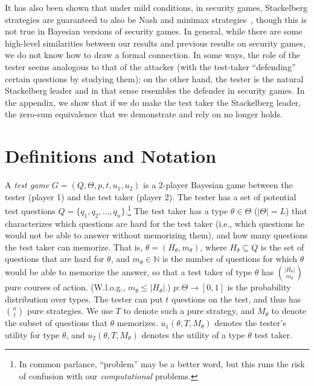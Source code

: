 \documentclass{article}
\begin{document}
It has also been shown that under mild conditions, in security games,
Stackelberg strategies are guaranteed to also be Nash and minimax
strategies~\cite{Korzhyk11:Stackelberg}, though this is not true in
Bayesian versions of
security games.
In general, while there are some high-level similarities between our results and
previous results on security games, we do not know how to draw a formal
connection.  In some ways, the role of the tester seems analogous to
that of the attacker
(with the test-taker ``defending'' certain questions by studying
them); on the other
hand, the tester is the natural Stackelberg leader and in that sense
resembles the defender in security games.
In the appendix, we show that if we do make the test taker the
Stackelberg leader, the zero-sum equivalence that we demonstrate and rely on
no longer holds.

\section{Definitions and Notation}


A \emph{test game} $G = (Q, \Theta, p, t, u_1, u_2)$ is a 2-player
Bayesian game
between the tester (player 1) and the test taker (player 2). 
The tester has a set of potential test
questions $Q = \{q_1, q_2, \ldots, q_n\}$.\footnote{In common parlance,
  ``problem'' may be a better word, but this runs the risk of confusion
  with our {\em computational} problems.}
  The test taker has a type
$\theta \in \Theta$ ($|\Theta| = L$) that characterizes which questions
are hard for the test taker
 (i.e., which questions he would
not be able to answer without memorizing them), and how many questions the test
taker can memorize.  That is, $\theta = (H_\theta, m_\theta)$, where
$H_\theta \subseteq Q$ is the set of questions that are hard for $\theta$,
and $m_\theta \in \mathbb N$ is the number of questions for which $\theta$
would be able to memorize the answer, so that a test taker of type $\theta$
has $|H_\theta| \choose m_\theta$ pure courses of action.
(W.l.o.g., $m_\theta \leq |H_\theta|$.)
$p: \Theta \rightarrow [0,1]$ is the
probability distribution over types.
The tester can put $t$ questions on the test, and thus has $n \choose t$
pure strategies.  We use $T$ to denote such a pure strategy, and $M_\theta$
to denote the subset of questions that $\theta$ memorizes.  $u_1(\theta, T,
M_\theta)$ denotes the tester's utility for type $\theta$, and $u_2(\theta,
T, M_\theta)$ denotes the utility of a type $\theta$ 
test taker.
\end{document}
